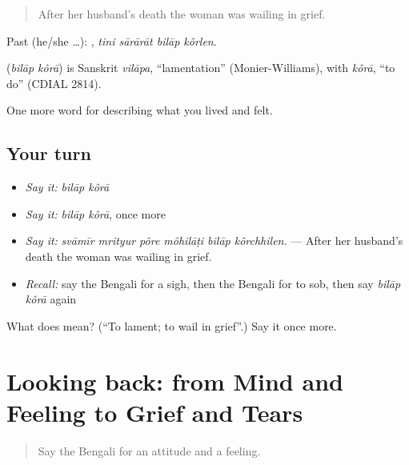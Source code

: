 \begin{quote}
After her husband's death the woman was wailing in grief.
\end{quote}

Past (he/she …):    , \emph{tini sārārāt bilāp kôrlen}.

\begin{cousinweb}
\textbf{ } (\emph{bilāp kôrā}) is Sanskrit \emph{vilāpa}, \textquotedblleft{}lamentation\textquotedblright{} (Monier-Williams), with \emph{kôrā}, \textquotedblleft{}to do\textquotedblright{} (CDIAL 2814).
\end{cousinweb}

\begin{grammarlens}[title={What you've built}]
One more word for describing what you lived and felt.
\end{grammarlens}

\subsection*{Your turn}
\begin{itemize}
\raggedright
  \item \emph{Say it:} \emph{bilāp kôrā}
  \item \emph{Say it:} \emph{bilāp kôrā}, once more
  \item \emph{Say it:} \emph{svāmīr mrityur pôre môhilāṭi bilāp kôrchhilen.} — After her husband's death the woman was wailing in grief.
  \item \emph{Recall:} say the Bengali for a sigh, then the Bengali for to sob, then say \emph{bilāp kôrā} again
\end{itemize}

\begin{tcolorbox}[breakable,colback=teal!4,colframe=teal!35!black,title={Before you move on}]
What does   mean? (\textquotedblleft{}To lament; to wail in grief\textquotedblright{}.) Say it once more.
\end{tcolorbox}
\section[(dialogue)]{Looking back: from Mind and Feeling to Grief and Tears}

\label{lesson:BN-R445-review-438-445}



\begin{quote}
Say the Bengali for an attitude and a feeling.
\end{quote}

